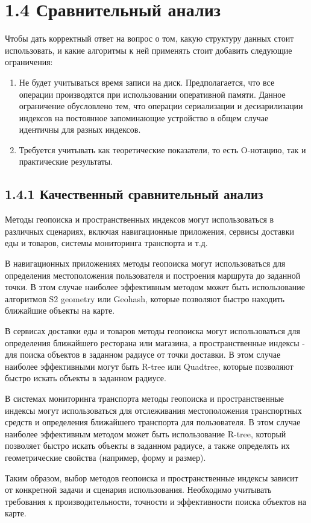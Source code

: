 \section{1.4 Сравнительный анализ}
Чтобы дать корректный ответ на вопрос о том, какую структуру данных стоит использовать, и какие алгоритмы к ней применять стоит добавить следующие ограничения:
\begin{enumerate}
    \item Не будет учитываться время записи на диск. Предполагается, что все операции производятся при использовании оперативной памяти. Данное ограничение обусловлено тем, что операции сериализации и десиарилизации индексов на постоянное запоминающие устройство в общем случае идентичны для разных индексов. 
    \item Требуется учитывать как теоретические показатели, то есть O-нотацию, так и практические результаты.
\end{enumerate}


\subsection{1.4.1 Качественный сравнительный анализ}
Методы геопоиска и пространственных индексов могут использоваться в различных сценариях, включая навигационные приложения, сервисы доставки еды и товаров, системы мониторинга транспорта и т.д. 

В навигационных приложениях методы геопоиска могут использоваться для определения местоположения пользователя и построения маршрута до заданной точки. В этом случае наиболее эффективным методом может быть использование алгоритмов S2 geometry или Geohash, которые позволяют быстро находить ближайшие объекты на карте. 

В сервисах доставки еды и товаров методы геопоиска могут использоваться для определения ближайшего ресторана или магазина, а пространственные индексы - для поиска объектов в заданном радиусе от точки доставки. В этом случае наиболее эффективными могут быть R-tree или Quadtree, которые позволяют быстро искать объекты в заданном радиусе. 

В системах мониторинга транспорта методы геопоиска и пространственные индексы могут использоваться для отслеживания местоположения транспортных средств и определения ближайшего транспорта для пользователя. В этом случае наиболее эффективным методом может быть использование R-tree, который позволяет быстро искать объекты в заданном радиусе, а также определять их геометрические свойства (например, форму и размер). 

Таким образом, выбор методов геопоиска и пространственные индексы зависит от конкретной задачи и сценария использования. Необходимо учитывать требования к производительности, точности и эффективности поиска объектов на карте. 

